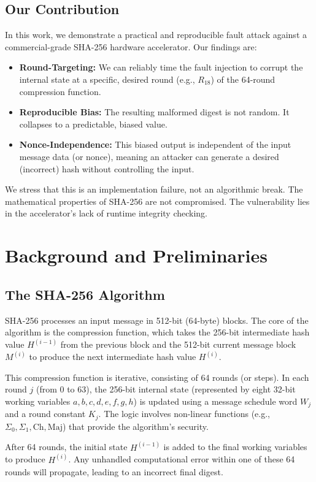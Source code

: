 \documentclass[11pt, a4paper]{article}
\begin{document}
\subsection*{Our Contribution}
In this work, we demonstrate a practical and reproducible fault attack against a commercial-grade SHA-256 hardware accelerator. Our findings are:
\begin{itemize}
    \item \textbf{Round-Targeting:} We can reliably time the fault injection to corrupt the internal state at a specific, desired round (e.g., $R_{18}$) of the 64-round compression function.
    \item \textbf{Reproducible Bias:} The resulting malformed digest is not random. It collapses to a predictable, biased value.
    \item \textbf{Nonce-Independence:} This biased output is independent of the input message data (or nonce), meaning an attacker can generate a desired (incorrect) hash without controlling the input.
\end{itemize}
We stress that this is an implementation failure, not an algorithmic break. The mathematical properties of SHA-256 are not compromised. The vulnerability lies in the accelerator's lack of runtime integrity checking.

\section{Background and Preliminaries}
\subsection{The SHA-256 Algorithm}
SHA-256 processes an input message in 512-bit (64-byte) blocks. The core of the algorithm is the compression function, which takes the 256-bit intermediate hash value $H^{(i-1)}$ from the previous block and the 512-bit current message block $M^{(i)}$ to produce the next intermediate hash value $H^{(i)}$.

This compression function is iterative, consisting of 64 rounds (or steps). In each round $j$ (from 0 to 63), the 256-bit internal state (represented by eight 32-bit working variables $a, b, c, d, e, f, g, h$) is updated using a message schedule word $W_j$ and a round constant $K_j$. The logic involves non-linear functions (e.g., $\Sigma_0, \Sigma_1, \text{Ch}, \text{Maj}$) that provide the algorithm's security.

After 64 rounds, the initial state $H^{(i-1)}$ is added to the final working variables to produce $H^{(i)}$. Any unhandled computational error within one of these 64 rounds will propagate, leading to an incorrect final digest.
\end{document}
